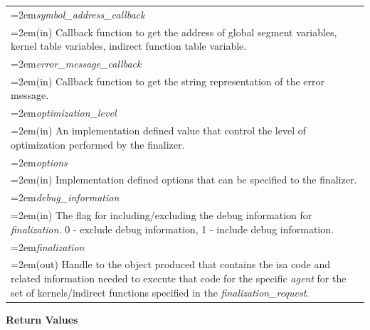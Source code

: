 \documentclass[final]{book}
\newcommand{\hsaarg}[1]{\textit{#1}}
\begin{document}
\begin{longtable}{@{}>{\hangindent=2em}p{\textwidth}}
\hsaarg{symbol_\-address_\-callback}\\\hspace{2em}(in) Callback function to get the address of global segment variables, kernel table variables, indirect function table variable.\\[2mm]
\hsaarg{error_\-message_\-callback}\\\hspace{2em}(in) Callback function to get the string representation of the error message.\\[2mm]
\hsaarg{optimization_\-level}\\\hspace{2em}(in) An implementation defined value that control the level of optimization performed by the finalizer.\\[2mm]
\hsaarg{options}\\\hspace{2em}(in) Implementation defined options that can be specified to the finalizer.\\[2mm]
\hsaarg{debug_\-information}\\\hspace{2em}(in) The flag for including/excluding the debug information for \textit{finalization}. 0 - exclude debug information, 1 - include debug information.\\[2mm]
\hsaarg{finalization}\\\hspace{2em}(out) Handle to the object produced that contains the isa code and related information needed to execute that code for the specific \textit{agent} for the set of kernels/indirect functions specified in the \textit{finalization_\-request}.
\end{longtable}
\vspace{-5mm}\noindent\textbf{Return Values}\\[-6mm]
\end{document}
